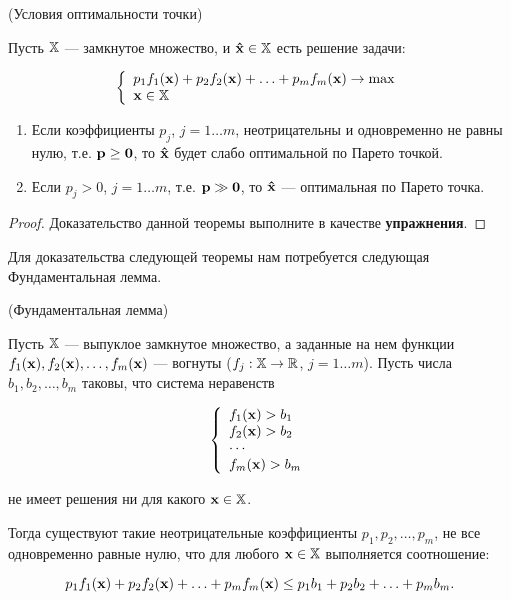 \begin{teop}\label{teo:Pareto_opt_conditions}(Условия оптимальности точки)

Пусть $\mathbb{X}$ --- замкнутое множество, и $\mathbf{\hat x} \in \mathbb{X}$
есть решение задачи:

\[ \left\{
\begin{array}{l}
 p_1 f_1 (\mathbf{x}) + p_2 f_2 (\mathbf{x}) + \ldots + p_m f_m (\mathbf{x})\to \max  \\
 \mathbf{x} \in \mathbb{X} \\
 \end{array} \right.
\]

\begin{enumerate}
\renewcommand{\theenumi}{(\roman{enumi})}

\item Если коэффициенты $p_j$, $j=1 \ldots m$, неотрицательны и одновременно не равны нулю,
т.е. $\mathbf{p} \geq \mathbf{0}$, то $\mathbf{\hat x}$ будет слабо оптимальной
по Парето точкой.

\item Если $p_j > 0$, $j=1 \ldots m$, т.е. $\mathbf{p} \gg \mathbf{0}$, то $\mathbf{\hat x}$ ---
оптимальная по Парето точка.

\end{enumerate}
\end{teop}

\begin{proof}
Доказательство данной теоремы выполните в качестве
\textbf{упражнения}.
\end{proof}

Для доказательства следующей теоремы нам потребуется следующая
Фундаментальная лемма.


\begin{lemp}(Фундаментальная лемма)

Пусть $\mathbb{X}$ --- выпуклое замкнутое множество, а заданные на нем
функции $f_1(\mathbf{x}), f_2(\mathbf{x}), \ldots, f_m(\mathbf{x})$ --- вогнуты
($f_j: \mathbb{X} \rightarrow \mathbb{R}$, $j=1 \ldots m$). Пусть числа $b_1,
b_2, \ldots, b_m$ таковы, что система неравенств

\[
\left\{ \begin{array}{l}
 f_1(\mathbf{x}) > b_1\\
 f_2(\mathbf{x}) > b_2 \\
  \cdots  \\
 f_m(\mathbf{x}) > b_m \\
 \end{array} \right.
\]

\noindent не имеет решения ни для какого $\mathbf{x} \in \mathbb{X}$.

Тогда существуют такие неотрицательные коэффициенты $p_1, p_2,
\ldots, p_m$, не все одновременно равные нулю, что для любого
$\mathbf{x} \in \mathbb{X}$ выполняется соотношение:

\begin{equation}\label{eq:ineq_fund_lemma}
p_1 f_1(\mathbf{x}) + p_2 f_2(\mathbf{x}) + \ldots + p_m f_m(\mathbf{x}) \leq
p_1 b_1 + p_2 b_2 + \ldots + p_m b_m.
\end{equation}

\end{lemp}

